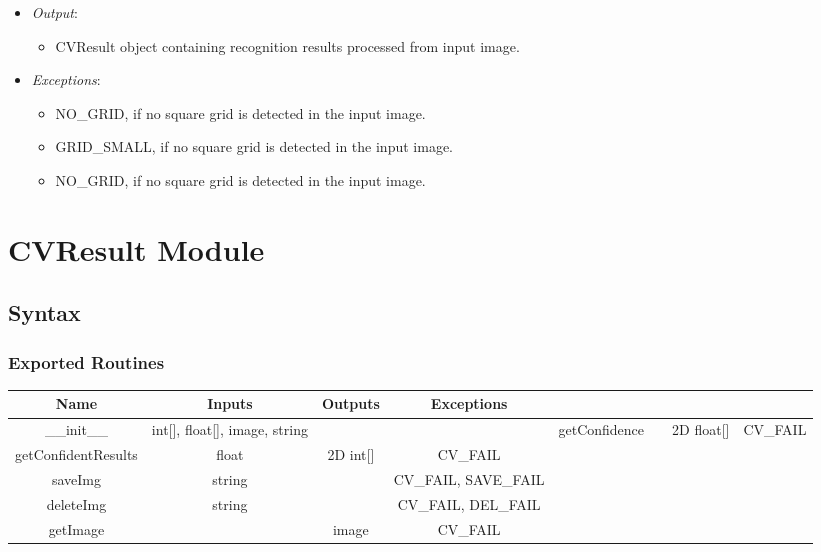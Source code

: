 \documentclass[11pt]{article}
\begin{document}
\begin{itemize}
\begin{itemize}
		    \item[] \textit{Output}: 
		    \begin{itemize}
		        \item CVResult object containing recognition results processed from input image.
		    \end{itemize}
		    
		    \item[] \textit{Exceptions}:
		    \begin{itemize}
		        \item NO\_GRID, if no square grid is detected in the input image.
		        \item GRID\_SMALL, if no square grid is detected in the input image.
		        \item NO\_GRID, if no square grid is detected in the input image.
		    \end{itemize}
		\end{itemize}
    \end{itemize}
			

\section{CVResult Module}
		\subsection{Syntax}
		\subsubsection{Exported Routines}
		\begin{tabular}[width=\textwidth, pos]{|c|c|c|c|}
			
			\hline
			\textbf{Name}& \textbf{Inputs} & \textbf{Outputs} & \textbf{Exceptions} \\ \hline
			\_\_init\_\_ & int[], float[], image, string &  & &
			getConfidence & & 2D float[] & CV\_FAIL \\
			getConfidentResults & float & 2D int[] & CV\_FAIL \\
			saveImg & string &  & CV\_FAIL, SAVE\_FAIL\\
		    deleteImg & string & & CV\_FAIL, DEL\_FAIL\\ 
			getImage & & image & CV\_FAIL\\

			
			\hline
			
		\end{tabular}
		
\end{document}
